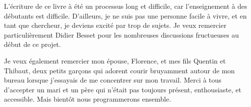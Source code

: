 \documentclass[a4paper,10pt,twoside]{book}
\begin{document}
L'\'ecriture de ce livre \`a \'et\'e un processus long et difficile, car l'enseignement \`a des d\'ebutants est difficile. D'ailleurs, je ne suis pas une personne facile \`a vivre, et en tant que chercheur, je deviens excit\'e par trop de sujets. Je veux remercier particuli\`erement Didier Besset pour les nombreuses discussions fructueuses au d\'ebut de ce projet.

Je veux \'egalement remercier mon \'epouse, Florence, et mes fils Quentin et Thibaut, deux petits gar\c cons qui adorent courir bruyamment autour de mon bureau lorsque j'essayais de me concentrer sur mon travail. Merci \`a tous d'accepter un mari et un p\`ere qui n'\'etait pas toujours pr\'esent, enthousiaste, et accessible. Mais bient\^ot nous programmerons ensemble.


\ifx\wholebook\relax\else
    
\end{document}
